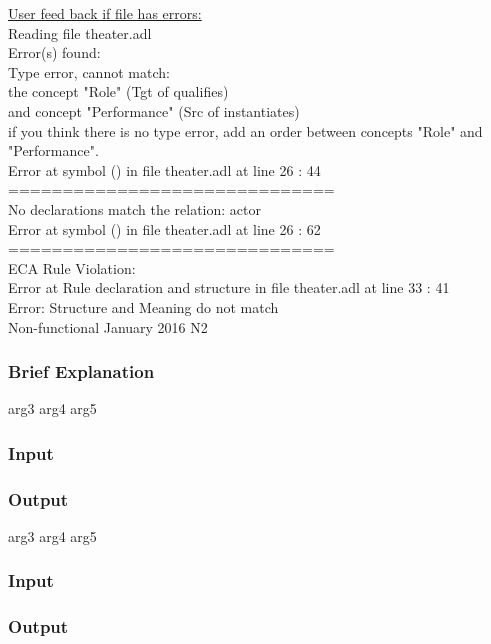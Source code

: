 \documentclass[12pt]{report}
\begin{document}
\noindent
\underline{User feed back if file has errors:} \\
Reading file theater.adl \\
Error(s) found:\\
Type error, cannot match:\\
the concept "Role" (Tgt of qualifies)\\
and concept "Performance" (Src of instantiates)\\
if you think there is no type error, add an order between concepts "Role" and 
"Performance".\\
Error at symbol () in file theater.adl at line 26 : 44 \\
============================== \\
No declarations match the relation: actor\\
Error at symbol () in file theater.adl at line 26 : 62\\
==============================\\
ECA Rule Violation: \\
Error at Rule declaration and structure in file theater.adl at line 33 : 41\\
Error: Structure and Meaning do not match\\

{Non-functional}
{January 2016}
{N2}
\vspace{-12pt}\subsubsection*{Brief Explanation}



{arg3}
{arg4}
{arg5}
\vspace{-12pt}\subsubsection*{Input}
\vspace{-12pt}\subsubsection*{Output}

{arg3}
{arg4}
{arg5}
\vspace{-12pt}\subsubsection*{Input}
\vspace{-12pt}\subsubsection*{Output}
	


\end{document}
